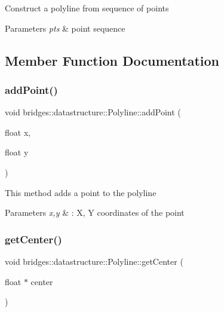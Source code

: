 Construct a polyline from sequence of points 
\begin{DoxyParams}{Parameters}
{\em pts} & point sequence \\
\hline
\end{DoxyParams}


\subsection{Member Function Documentation}
\mbox{\label{classbridges_1_1datastructure_1_1_polyline_a00698223911f07cafca29ec80c507678}} 
\subsubsection{\texorpdfstring{add\+Point()}{addPoint()}}
{\footnotesize\ttfamily void bridges\+::datastructure\+::\+Polyline\+::add\+Point (\begin{DoxyParamCaption}\item[{float}]{x,  }\item[{float}]{y }\end{DoxyParamCaption})\hspace{0.3cm}{\ttfamily [inline]}}

This method adds a point to the polyline


\begin{DoxyParams}{Parameters}
{\em x,y} & \+: X, Y coordinates of the point \\
\hline
\end{DoxyParams}
\mbox{\label{classbridges_1_1datastructure_1_1_polyline_ad0783deb77873eda19528681bbbca25c}} 
\subsubsection{\texorpdfstring{get\+Center()}{getCenter()}}
{\footnotesize\ttfamily void bridges\+::datastructure\+::\+Polyline\+::get\+Center (\begin{DoxyParamCaption}\item[{float $\ast$}]{center }\end{DoxyParamCaption})\hspace{0.3cm}{\ttfamily [inline]}}

